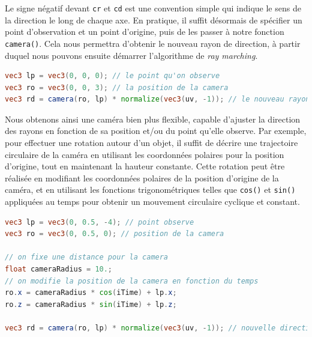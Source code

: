 Le signe négatif devant \lstinline{cr} et \lstinline{cd} est une convention simple qui indique le sens de la direction le long de chaque axe. En pratique, il suffit désormais de spécifier un point d'observation et un point d'origine, puis de les passer à notre fonction \lstinline{camera()}. Cela nous permettra d'obtenir le nouveau rayon de direction, à partir duquel nous pouvons ensuite démarrer l'algorithme de  \textit{ray marching}.

\begin{minipage}{\linewidth}
\begin{lstlisting}[language=GLSL, caption=Transformation du rayon,captionpos=b,frame=single]
vec3 lp = vec3(0, 0, 0); // le point qu'on observe
vec3 ro = vec3(0, 0, 3); // la position de la camera
vec3 rd = camera(ro, lp) * normalize(vec3(uv, -1)); // le nouveau rayon de direction
\end{lstlisting}
\end{minipage}

Nous obtenons ainsi une caméra bien plus flexible, capable d'ajuster la direction des rayons en fonction de sa position et/ou du point qu'elle observe. Par exemple, pour effectuer une rotation autour d'un objet, il suffit de décrire une trajectoire circulaire de la caméra en utilisant les coordonnées polaires pour la position d'origine, tout en maintenant la hauteur constante. Cette rotation peut être réalisée en modifiant les coordonnées polaires de la position d'origine de la caméra, et en utilisant les fonctions trigonométriques telles que \lstinline{cos()} et \lstinline{sin()} appliquées au temps pour obtenir un mouvement circulaire cyclique et constant.


\begin{minipage}{\linewidth}
\begin{lstlisting}[language=GLSL, caption=Rotation de la caméra autour d'un objet,captionpos=b,frame=single]
vec3 lp = vec3(0, 0.5, -4); // point observe
vec3 ro = vec3(0, 0.5, 0); // position de la camera

// on fixe une distance pour la camera
float cameraRadius = 10.;
// on modifie la position de la camera en fonction du temps
ro.x = cameraRadius * cos(iTime) + lp.x;
ro.z = cameraRadius * sin(iTime) + lp.z;

vec3 rd = camera(ro, lp) * normalize(vec3(uv, -1)); // nouvelle direction de rayon
\end{lstlisting}
\end{minipage}


\newpage
